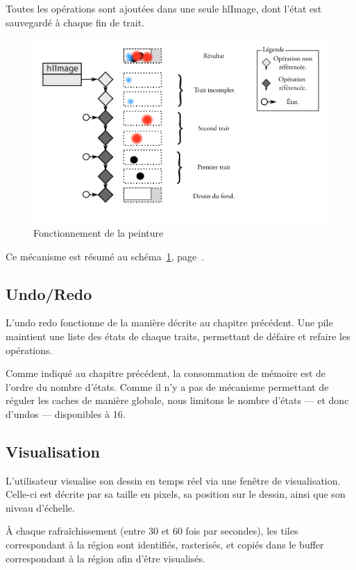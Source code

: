 			Toutes les opérations sont ajoutées dans une seule hlImage, dont l'état
			est sauvegardé à chaque fin de trait.
		\begin{figure}[ht]
			\centering
			\includegraphics[width=\textwidth]{images/draw} 
			\caption{Fonctionnement de la peinture}
			\label{fig:draw}
		\end{figure}

			Ce mécanisme est résumé au schéma~\ref{fig:draw}, page~\pageref{fig:draw}.
			
		\subsection{Undo/Redo}
			L'undo redo fonctionne de la manière décrite au chapitre précédent.
			Une pile maintient une liste des états de chaque traits, permettant de défaire
			et refaire les opérations. 

			Comme indiqué au chapitre précédent, la consommation de mémoire est de
			l'ordre du nombre d'états. Comme il n'y a pas de mécanisme permettant de
			réguler les caches de manière globale, nous limitons le nombre d'états --- et donc d'undos --- disponibles
			à 16.
		\subsection{Visualisation}
			L'utilisateur visualise son dessin en temps réel via une fenêtre de visualisation.
			Celle-ci est décrite par sa taille en pixels, sa position sur le dessin, ainsi
			que son niveau d'échelle. 
			
			À chaque rafraîchissement (entre 30 et 60 fois par secondes), les tiles correspondant
			à la région sont identifiés, rasterisés, et copiés dans le buffer correspondant à la région
			afin d'être visualisés. 

